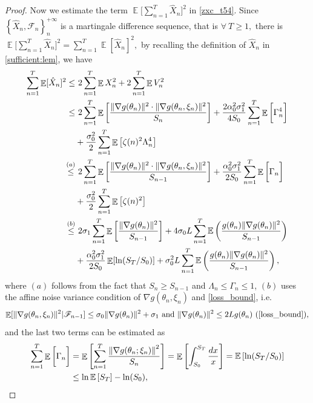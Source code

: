 \documentclass[standalone]{article}
\newcommand{\E}{\mathbb{E}}
\DeclareMathOperator{\Expect}{\mathbb{E}}
\begin{document}
\begin{proof}
Now we estimate the term \(\Expect\big[\sum_{n=1}^{T}\hat{X}_{n}\big]^{2}\) in \cref{zxc_t54}. Since  $\left\lbrace \hat{X}_{n},\mathscr{F}_{n}\right\rbrace_{n}^{+\infty}$ is a martingale difference sequence, that is $\forall\ T\ge 1,$ there is
$\Expect\bigg[\sum_{n=1}^{T}\hat{X}_{n}\bigg]^{2}=\sum_{n=1}^{T}\Expect[\hat{X}_{n}]^{2},$ by recalling the definition of $\hat{X}_{n}$ in \cref{sufficient:lem}, we have
\begin{equation}\nonumber\begin{aligned}
\sum_{n=1}^{T}\Expect[\hat{X}_{n}]^{2} \leq&\ 2 \sum_{n=1}^{T}\Expect X_{n}^{2} + 2 \sum_{n=1}^{T}\Expect V_{n}^{2} \notag \\
\le&\ 2\sum_{n=1}^{T}\Expect\bigg[\frac{\|\nabla g(\theta_{n})\|^{2}\cdot\|\nabla g(\theta_{n},\xi_{n})\|^{2}}{S_{n}}\bigg]+\frac{2\alpha_{0}^{2}\sigma_{1}^{2}}{4S_{0}}\sum_{n=1}^{T}\Expect\bigg[\Gamma_n^4\bigg]\notag\\& + \frac{\sigma_0^2}{2}\sum_{n=1}^{T}\Expect\left[\zeta(n)^2 \Lambda_n^4\right]\\
\mathop{\leq}^{(a)} &\ 2\sum_{n=1}^{T}\Expect\bigg[\frac{\|\nabla g(\theta_{n})\|^{2}\cdot\|\nabla g(\theta_{n},\xi_{n})\|^{2}}{S_{n-1}}\bigg]+\frac{\alpha_{0}^{2}\sigma_{1}^{2}}{2S_{0}}\sum_{n=1}^{T}\Expect\bigg[\Gamma_n\bigg]\notag\\& + \frac{\sigma_0^2}{2}\sum_{n=1}^{T}\Expect\left[\zeta(n)^2\right]   \notag \\
\mathop{\le}^{(b)} &\ 2\sigma_{1}\sum_{n=1}^{T}\Expect\bigg[\frac{\|\nabla g(\theta_{n})\|^{2}}{S_{n-1}}\bigg]+4\sigma_{0} L\sum_{n=1}^{T}\E\left(\frac{g(\theta_{n})\|\nabla g(\theta_{n})\|^{2}}{S_{n-1}}\right)\notag\\&+\frac{\alpha_{0}^{2}\sigma_{1}^{2}}{2S_{0}}\Expect[\ln( S_{T} / S_0)]  + \sigma_0^2 L\sum_{n=1}^{T}\E\left(\frac{g(\theta_{n})\|\nabla g(\theta_{n})\|^{2}}{S_{n-1}}\right) ,
\end{aligned}\end{equation}
where $(a)$ follows from the fact that $S_n \geq S_{n-1}$ and $\Lambda_n \leq \Gamma_n  \leq 1$, $(b)$ uses the affine noise variance condition of $\nabla g(\theta_{n},\xi_{n})$ and \cref{loss_bound}, i.e.
\[\Expect[\|\nabla g(\theta_{n},\xi_{n})\|^{2}|\mathscr{F}_{n-1}]\le \sigma_{0}\|\nabla g(\theta_{n})\|^{2}+\sigma_{1}\ \text{and}\ \|\nabla g(\theta_{n})\|^{2}\le 2 Lg(\theta_{n})\ (\text{\cref{loss_bound}}),\]
and the last two terms can be estimated as
\begin{align}
\sum_{n=1}^{T}\Expect\bigg[\Gamma_n\bigg] &  = \Expect \left[\sum_{n=1}^{T} \frac{\left\|\nabla g(\theta_n; \xi_n)\right\|^2}{S_n}\right] = \Expect \left[\int_{S_0}^{S_T} \frac{dx}{x} \right] = \E \left[\ln(S_T/S_0) \right] \\&\leq \ln \E\left[S_T\right]- \ln(S_0), \notag \\

\end{align}
\end{proof}
\end{document}
